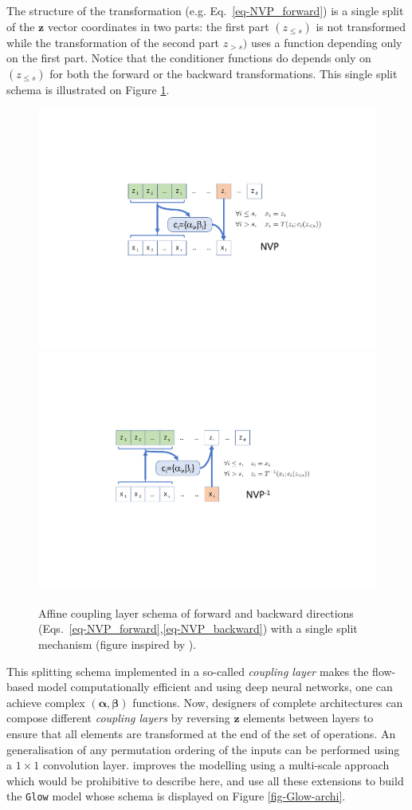 \documentclass[11pt]{amsart}
\begin{document}
The structure of the transformation (e.g. Eq.~\ref{eq-NVP_forward}) is a single split of the $\bm{z}$ vector coordinates in two parts: the first part $(z_{\leq s})$ is not transformed while the transformation of the second part ${z_{>s}})$ uses a function depending only on the first part. Notice that the conditioner functions do depends only on $(z_{\leq s})$ for both the forward or the backward transformations. This single split schema is illustrated on Figure \ref{fig-nvp}. 
%
\begin{figure}
\centering
\includegraphics[width=0.45\columnwidth]{fig-nvp.pdf}
\includegraphics[width=0.45\columnwidth]{fig-nvp-inverse.pdf}
\caption{Affine coupling layer schema of forward and backward directions (Eqs.~\ref{eq-NVP_forward},\ref{eq-NVP_backward}) with a single split mechanism (figure inspired by \cite{Papamakarios2021}).}
\label{fig-nvp}
\end{figure}
%
This splitting schema implemented in a so-called \textit{coupling layer} makes the flow-based model computationally efficient and using deep neural networks, one can achieve complex $(\bm{\alpha},\bm{\beta})$ functions. Now, designers of complete architectures can compose different \textit{coupling layers} by reversing $\bm{z}$ elements between layers to ensure that all elements are transformed at the end of the set of operations. An generalisation of any permutation ordering of the inputs can be performed using a $1\times 1$ convolution layer. \cite{2016arXiv160508803D} improves the modelling using a multi-scale approach which would be prohibitive to describe here, and \cite{Kingma2018} use all these extensions to build the \texttt{Glow} model whose schema is displayed on Figure \ref{fig-Glow-archi}.
\end{document}

